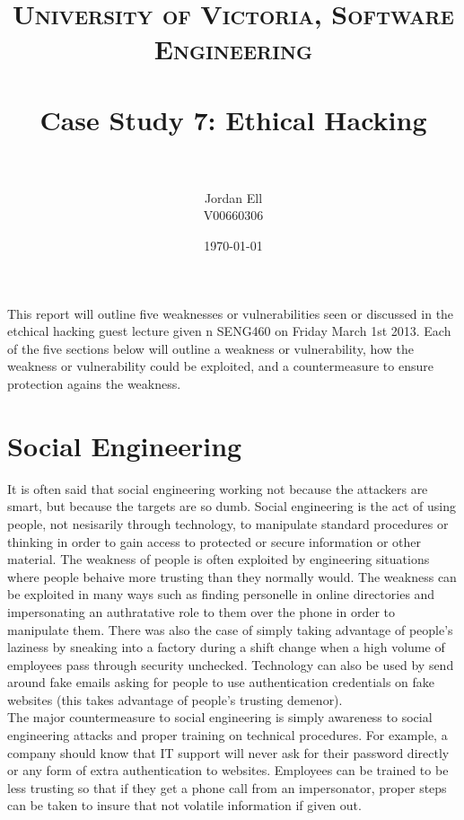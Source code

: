\documentclass[paper=a4, fontsize=11pt]{scrartcl} %
\title{	
\normalfont \normalsize 
\textsc{University of Victoria, Software Engineering} \\ [25pt] %
\horrule{0.5pt} \\[0.4cm] %
\huge Case Study 7: Ethical Hacking \\ %
\horrule{2pt} \\[0.5cm] %
}
\author{Jordan Ell \\ V00660306} %
\date{\normalsize\today} %
\numberwithin{equation}{section} %
\numberwithin{figure}{section} %
\numberwithin{table}{section} %
\begin{document}
\maketitle %

This report will outline five weaknesses or vulnerabilities seen or discussed
in the etchical hacking guest lecture given n SENG460 on Friday March 1st 
2013. Each of the five sections below will outline a weakness or vulnerability,
how the weakness or vulnerability could be exploited, and a countermeasure
to ensure protection agains the weakness.

\section{Social Engineering}
It is often said that social engineering working not because the attackers are
smart, but because the targets are so dumb. Social engineering is the act of
using people, not nesisarily through technology, to manipulate standard
procedures or thinking in order to gain access to protected or secure
information or other material. The weakness of people is often exploited by
engineering situations where people behaive more trusting than they normally 
would. The weakness can be exploited in many ways such as finding personelle
in online directories and impersonating an authratative role to them over
the phone in order to manipulate them. There was also the case of simply
taking advantage of people's laziness by sneaking into a factory during a shift
change when a high volume of employees pass through security unchecked. 
Technology can also be used by send around fake emails asking for people to
use authentication credentials on fake websites (this takes advantage of 
people's trusting demenor).\\

The major countermeasure to social engineering is simply awareness to social
engineering attacks and proper training on technical procedures. For example,
a company should know that IT support will never ask for their password
directly or any form of extra authentication to websites. Employees can be
trained to be less trusting so that if they get a phone call from an 
impersonator, proper steps can be taken to insure that not volatile information
if given out.
\end{document}
